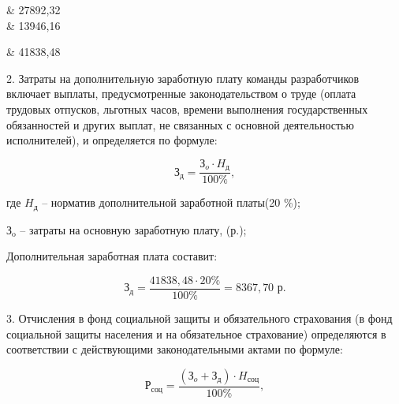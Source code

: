 \begin{table}[!h!t]
\begin{tabular}
		\hline
		                                                                                              & 27892,32                                                                                                            \\

		\hline
		                                                                                       & 13946,16                                                                                                            \\
		\hline

		 & 41838,48                                                                                                            \\
		\hline
	\end{tabular}
\end{table}

2. Затраты на дополнительную заработную плату команды разработчиков включает выплаты, предусмотренные законодательством о труде (оплата трудовых отпусков, льготных часов, времени выполнения государственных обязанностей и других выплат, не связанных с основной деятельностью исполнителей), и определяется по формуле:

\begin{equation}
	\text{З}_{\text{д}} = \frac{\text{З}_{o}\cdot H_\text{д}}{100\%},
\end{equation}


где $H_\text{д}$ -- норматив дополнительной              заработной платы(20 \%);

$\text{З}_{\text{o}}$ -- затраты на основную заработную плату, (р.);




Дополнительная заработная плата составит:

$$
	\text{З}_{\text{д}} = \frac{41838,48 \cdot 20\%}{100\%} = 8367,70 \text{ р}.
$$

3. Отчисления в фонд социальной защиты и обязательного страхования (в фонд социальной защиты населения и на обязательное страхование) определяются в соответствии с действующими законодательными актами по формуле:

\begin{equation}
	\text{Р}_{\text{соц}} = \frac{(\text{З}_{o} + \text{З}_{\text{д}})\cdot H_\text{соц}}{100\%},
\end{equation}

